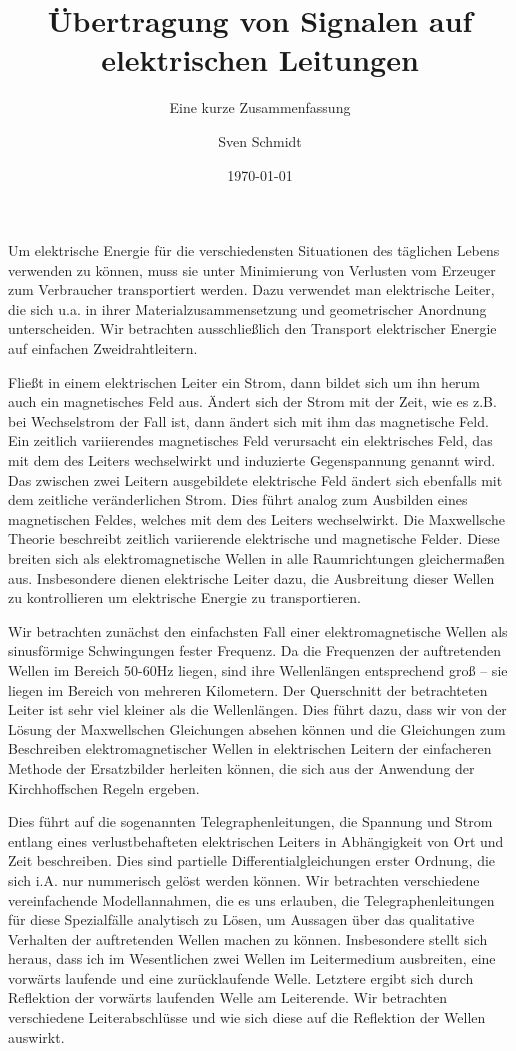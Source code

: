 \documentclass[12pt,ngerman,parkskip=half-]{scrreprt}
\title{Übertragung von Signalen auf elektrischen Leitungen}
\subtitle{Eine kurze Zusammenfassung}
\author{Sven Schmidt}
\date{\today}
\begin{document}
\maketitle

Um elektrische Energie für die verschiedensten Situationen des täglichen Lebens verwenden zu können, muss sie unter Minimierung von Verlusten vom Erzeuger zum Verbraucher transportiert werden. Dazu verwendet man elektrische Leiter, die sich u.a. in ihrer Materialzusammensetzung und geometrischer Anordnung unterscheiden.
Wir betrachten ausschließlich den Transport elektrischer Energie auf einfachen Zweidrahtleitern.

Fließt in einem elektrischen Leiter ein Strom, dann bildet sich um ihn herum auch ein magnetisches Feld aus. Ändert sich der Strom mit der Zeit, wie es z.B. bei Wechselstrom der Fall ist, dann ändert sich mit ihm das magnetische Feld. Ein zeitlich variierendes magnetisches Feld verursacht ein elektrisches Feld, das mit dem des Leiters wechselwirkt und induzierte Gegenspannung genannt wird. Das zwischen zwei Leitern ausgebildete elektrische Feld ändert sich ebenfalls mit dem zeitliche veränderlichen Strom. Dies führt analog zum Ausbilden eines magnetischen Feldes, welches mit dem des Leiters wechselwirkt. Die Maxwellsche Theorie beschreibt zeitlich variierende elektrische und magnetische Felder. Diese breiten sich als elektromagnetische Wellen in alle Raumrichtungen gleichermaßen aus. Insbesondere dienen elektrische Leiter dazu, die Ausbreitung dieser Wellen zu kontrollieren um elektrische Energie zu transportieren.

Wir betrachten zunächst den einfachsten Fall einer elektromagnetische Wellen als sinusförmige Schwingungen fester Frequenz. Da die Frequenzen der auftretenden Wellen im Bereich 50-60Hz liegen, sind ihre Wellenlängen entsprechend groß -- sie liegen im Bereich von mehreren Kilometern. Der Querschnitt der betrachteten Leiter ist sehr viel kleiner als die Wellenlängen. Dies führt dazu, dass wir von der Lösung der Maxwellschen Gleichungen absehen können und die Gleichungen zum Beschreiben elektromagnetischer Wellen in elektrischen Leitern der einfacheren Methode der Ersatzbilder herleiten können, die sich aus der Anwendung der Kirchhoffschen Regeln ergeben.

Dies führt auf die sogenannten Telegraphenleitungen, die Spannung und Strom entlang eines verlustbehafteten elektrischen Leiters in Abhängigkeit von Ort und Zeit beschreiben. Dies sind partielle Differentialgleichungen erster Ordnung, die sich i.A. nur nummerisch gelöst werden können. Wir betrachten verschiedene vereinfachende Modellannahmen, die es uns erlauben, die Telegraphenleitungen für diese Spezialfälle analytisch zu Lösen, um Aussagen über das qualitative Verhalten der auftretenden Wellen machen zu können.  Insbesondere stellt sich heraus, dass ich im Wesentlichen zwei Wellen im Leitermedium ausbreiten, eine vorwärts laufende und eine zurücklaufende Welle. Letztere ergibt sich durch Reflektion der vorwärts laufenden Welle am Leiterende. Wir betrachten verschiedene Leiterabschlüsse und wie sich diese auf die Reflektion der Wellen auswirkt.
\end{document}
